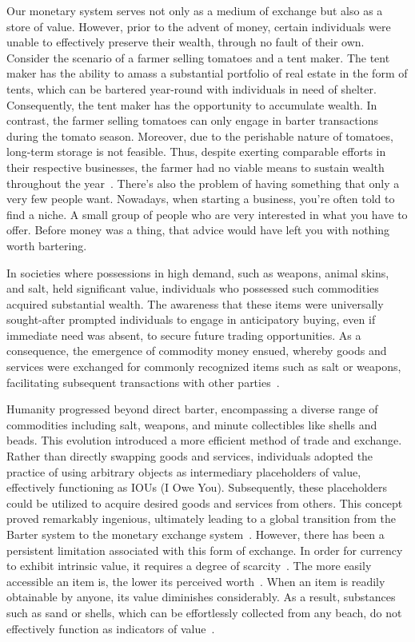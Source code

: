 Our monetary system serves not only as a medium of exchange but also as a store of value. However, prior to the advent of
money, certain individuals were unable to effectively preserve their wealth, through no fault of their own. Consider the
scenario of a farmer selling tomatoes and a tent maker. The tent maker has the ability to amass a substantial portfolio
of real estate in the form of tents, which can be bartered year-round with individuals in need of shelter. Consequently,
the tent maker has the opportunity to accumulate wealth. In contrast, the farmer selling tomatoes can only engage in barter
transactions during the tomato season. Moreover, due to the perishable nature of tomatoes, long-term storage is not feasible.
Thus, despite exerting comparable efforts in their respective businesses, the farmer had no viable means to sustain wealth
throughout the year~\cite{de2016origins}. There's also the problem of having something that only a very few people want.
Nowadays, when starting a business, you're often told to find a niche. A small group of people who are very interested in
what you have to offer. Before money was a thing, that advice would have left you with nothing worth bartering.

In societies where possessions in high demand, such as weapons, animal skins, and salt, held significant value, individuals
who possessed such commodities acquired substantial wealth. The awareness that these items were universally sought-after
prompted individuals to engage in anticipatory buying, even if immediate need was absent, to secure future trading
opportunities. As a consequence, the emergence of commodity money ensued, whereby goods and services were exchanged for
commonly recognized items such as salt or weapons, facilitating subsequent transactions with other parties~\cite{polanyi1965trade}.

Humanity progressed beyond direct barter, encompassing a diverse range of commodities including salt, weapons, and minute
collectibles like shells and beads. This evolution introduced a more efficient method of trade and exchange. Rather than
directly swapping goods and services, individuals adopted the practice of using arbitrary objects as intermediary
placeholders of value, effectively functioning as IOUs (I Owe You). Subsequently, these placeholders could be utilized to
acquire desired goods and services from others. This concept proved remarkably ingenious, ultimately leading to a global
transition from the Barter system to the monetary exchange system~\cite{graeber2012debt}. However, there has been a persistent
limitation associated with this form of exchange. In order for currency to exhibit intrinsic value, it requires a degree
of scarcity~\cite{smith2010wealth, ricardo1821principles}. The more easily accessible an item is, the lower its perceived
worth~\cite{marshall2009principles}. When an item is readily obtainable by anyone, its value diminishes considerably. As
a result, substances such as sand or shells, which can be effortlessly collected from any beach, do not effectively function
as indicators of value~\cite{principlesmenger, hicks1936keynes}.

